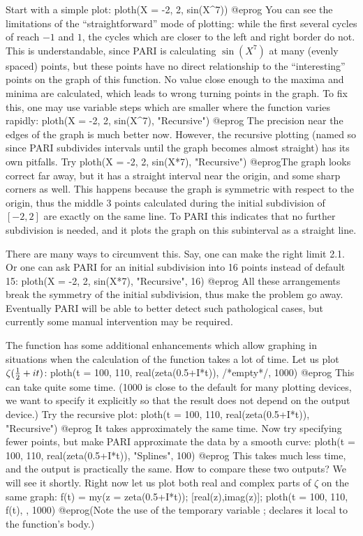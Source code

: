 Start with a simple plot:
\bprog
  ploth(X = -2, 2, sin(X^7))
@eprog\noindent
You can see the limitations of the ``straightforward'' mode of plotting:
while the first several cycles of  reach $-1$ and $1$, the cycles
which are closer to the left and right border do not. This is understandable,
since PARI is calculating $\sin(X^7)$ at many (evenly spaced) points, but
these points have no direct relationship to the ``interesting'' points on
the graph of this function.  No value close enough to the maxima and minima
are calculated, which leads to wrong turning points in the graph. To fix
this, one may use variable steps which are smaller where the function varies
rapidly:
\bprog
  ploth(X = -2, 2, sin(X^7), "Recursive")
@eprog\noindent
The precision near the edges of the graph is much better now.
However, the recursive plotting (named so since PARI subdivides intervals
until the graph becomes almost straight) has its own pitfalls.  Try
\bprog
  ploth(X = -2, 2, sin(X*7), "Recursive")
@eprog\noindent The graph looks correct far away, but it has a straight
interval near the origin, and some sharp corners as well.  This happens
because the graph is symmetric with respect to the origin, thus the middle 3
points calculated during the initial subdivision of $[-2,2]$ are exactly on
the same line.  To PARI this indicates that no further subdivision is needed,
and it plots the graph on this subinterval as a straight line.

There are many ways to circumvent this.  Say, one can make the right limit
2.1.  Or one can ask PARI for an initial subdivision into 16 points instead
of default 15:
\bprog
  ploth(X = -2, 2, sin(X*7), "Recursive", 16)
@eprog\noindent
All these arrangements break the symmetry of the initial subdivision, thus
make the problem go away.  Eventually PARI will be able to better detect such
pathological cases, but currently some manual intervention may be required.

The function  has some additional enhancements which allow
graphing in situations when the calculation of the function takes a lot of
time.  Let us plot $\zeta({1\over 2} + it)$:
\bprog
  ploth(t = 100, 110, real(zeta(0.5+I*t)), /*empty*/, 1000)
@eprog\noindent
This can take quite some time.  (1000 is close to the default for many
plotting devices, we want to specify it explicitly so that the result does
not depend on the output device.)  Try the recursive plot:
\bprog
  ploth(t = 100, 110, real(zeta(0.5+I*t)), "Recursive")
@eprog\noindent
It takes approximately the same time.  Now try specifying fewer points,
but make PARI approximate the data by a smooth curve:
\bprog
  ploth(t = 100, 110, real(zeta(0.5+I*t)), "Splines", 100)
@eprog\noindent
This takes much less time, and the output is practically the same.  How to
compare these two outputs?  We will see it shortly.  Right now let us plot
both real and complex parts of $\zeta$ on the same graph:
\bprog
  f(t) = my(z = zeta(0.5+I*t)); [real(z),imag(z)];
  ploth(t = 100, 110, f(t), , 1000)
@eprog\noindent (Note the use of the temporary variable ; 
declares it local to the function's body.)

